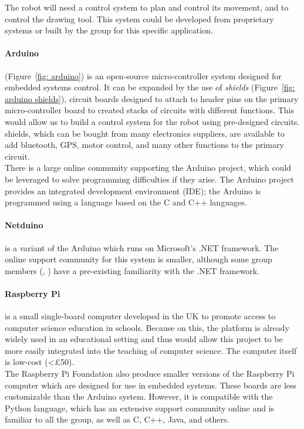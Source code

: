         The robot will need a control system to plan and control its movement, and to control the drawing tool. This system could be developed from proprietary systems or built by the group for this specific application.

        \paragraph{\gls{Arduino}} (Figure~\ref{fig: arduino}) is an open-source micro-controller system designed for embedded systems control. It can be expanded by the use of \emph{\glspl{shield}} (Figure~\ref{fig: arduino shields}), circuit boards designed to attach to header pins on the primary micro-controller board to created stacks of circuits with different functions. This would allow us to build a control system for the robot using pre-designed circuits. \Glspl{shield}, which can be bought from many electronics suppliers, are available to add bluetooth, GPS, motor control, and many other functions to the primary circuit.\\
        There is a large online community supporting the \gls{Arduino} project, which could be leveraged to solve programming difficulties if they arise. The \gls{Arduino} project provides an integrated development environment (IDE); the \gls{Arduino} is programmed using a language based on the C and C++ languages.
        \paragraph{Netduino} is a variant of the \gls{Arduino} which runs on Microsoft's .NET framework. The online support community for this system is smaller, although some group members (\AG, \LY) have a pre-existing familiarity with the .NET framework.\\

        \paragraph{Raspberry Pi} is a small single-board computer developed in the UK to promote access to computer science education in schools. Because on this, the platform is already widely used in an educational setting and thus would allow this project to be more easily integrated into the teaching of computer science. The computer itself is low-cost (<\pounds{50}).\\
        The Raspberry Pi Foundation also produce smaller versions of the Raspberry Pi computer which are designed for use in embedded systems. These boards are less customizable than the Arduino system. However, it is compatible with the Python language, which has an extensive support community online and is familiar to all the group, as well as C, C++, Java, and others.

